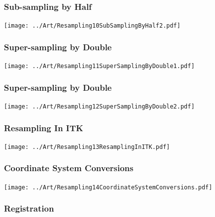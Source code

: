 \begin{frame}
  \frametitle{Sub-sampling by Half}
  \texttt{[image: ../Art/Resampling10SubSamplingByHalf2.pdf]}
\end{frame}

\begin{frame}
  \frametitle{Super-sampling by Double}
  \texttt{[image: ../Art/Resampling11SuperSamplingByDouble1.pdf]}
\end{frame}

\begin{frame}
  \frametitle{Super-sampling by Double}
  \texttt{[image: ../Art/Resampling12SuperSamplingByDouble2.pdf]}
\end{frame}

\begin{frame}
  \frametitle{Resampling In ITK}
  \texttt{[image: ../Art/Resampling13ResamplingInITK.pdf]}
\end{frame}

\begin{frame}
  \frametitle{Coordinate System Conversions}
  \texttt{[image: ../Art/Resampling14CoordinateSystemConversions.pdf]}
\end{frame}

\subsubsection{Registration}




